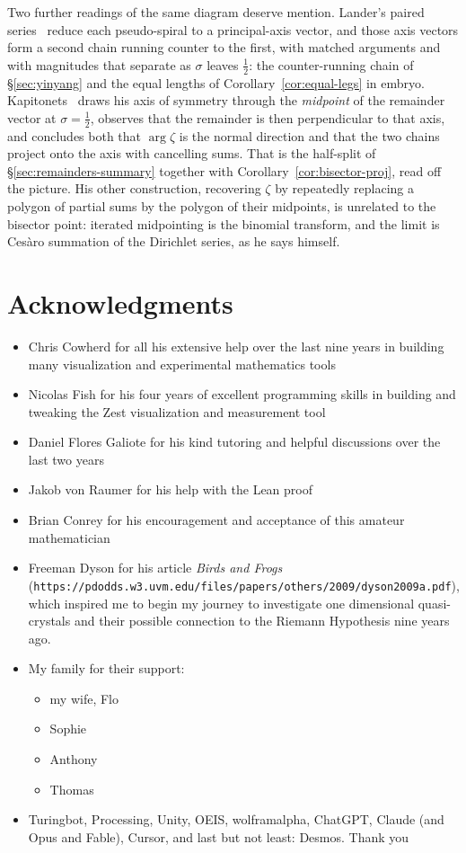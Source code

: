 \documentclass[11pt]{article}
\theoremstyle{definition}
\begin{document}
Two further readings of the same diagram deserve mention. Lander's paired
series~\cite{Lander2017,Lander2018} reduce each pseudo-spiral to a principal-axis
vector, and those axis vectors form a second chain running counter to the first,
with matched arguments and with magnitudes that separate as $\sigma$ leaves
$\tfrac12$: the counter-running chain of \S\ref{sec:yinyang} and the equal
lengths of Corollary~\ref{cor:equal-legs} in embryo.
Kapitonets~\cite{Kapitonets2019} draws his axis of symmetry through the
\emph{midpoint} of the remainder vector at $\sigma=\tfrac12$, observes that the
remainder is then perpendicular to that axis, and concludes both that
$\arg\zeta$ is the normal direction and that the two chains project onto the axis
with cancelling sums. That is the half-split of
\S\ref{sec:remainders-summary} together with Corollary~\ref{cor:bisector-proj},
read off the picture. His other construction,
recovering $\zeta$ by repeatedly replacing a polygon of partial sums by the
polygon of their midpoints, is unrelated to the bisector point: iterated
midpointing is the binomial transform, and the limit is Ces\`aro summation of the
Dirichlet series, as he says himself.

\section*{Acknowledgments}
\begin{itemize}
  \item Chris Cowherd for all his extensive help over the last nine years in building many visualization and experimental mathematics tools
  \item Nicolas Fish for his four years of excellent programming skills in building and tweaking the Zest visualization and measurement tool
  \item Daniel Flores Galiote for his kind tutoring and helpful discussions over the last two years
  \item Jakob von Raumer for his help with the Lean proof
  \item Brian Conrey for his encouragement and acceptance of this amateur mathematician
  \item Freeman Dyson for his article {\it Birds and Frogs} \\(\texttt {\small https://pdodds.w3.uvm.edu/files/papers/others/2009/dyson2009a.pdf}), which inspired me to begin my journey to investigate one dimensional quasi-crystals and their possible connection to the Riemann Hypothesis nine years ago.
  \item My family for their support:
    \begin{itemize}
      \item my wife, Flo
      \item Sophie
      \item Anthony
      \item Thomas
    \end{itemize}
  \item Turingbot, Processing, Unity, OEIS, wolframalpha, ChatGPT, Claude (and Opus and Fable), Cursor, and last but not least: Desmos.  Thank you
\end{itemize}
\end{document}
